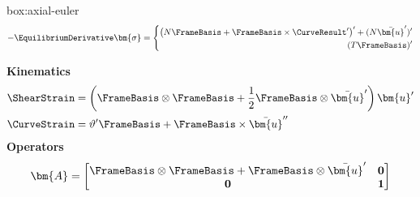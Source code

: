 \begin{ambox}{box:axial-euler}
\begin{equation*}
-\EquilibriumDerivative\bm{\sigma}
=
\left\{
\begin{aligned}
  \left(N\FrameBasis  + \FrameBasis \times\CurveResult^{\prime}\right)^{\prime} + (N \bar{\bm{u}}^{\prime})^{\prime} \\
  (T\FrameBasis )^{\prime}
\end{aligned}
\right.
\end{equation*}

\textbf{Kinematics}
\begin{equation*}
\begin{aligned}
\ShearStrain &= \left(\FrameBasis \otimes\FrameBasis  + \frac{1}{2}\FrameBasis \otimes\bar{\bm{u}}^{\prime}\right)\bm{u}^{\prime} \\
\CurveStrain &= \vartheta^{\prime} \FrameBasis  
 + \FrameBasis \times\bar{\bm{u}}^{\prime\prime}
\end{aligned}
\end{equation*}
\textbf{Operators}
\begin{equation*}
\bm{A} = 
\begin{bmatrix}
\FrameBasis \otimes\FrameBasis  + \FrameBasis \otimes\bar{\bm{u}}^{\prime} & \mathbf{0} \\
\mathbf{0} & \mathbf{1}
\end{bmatrix}
\end{equation*}
\end{ambox}